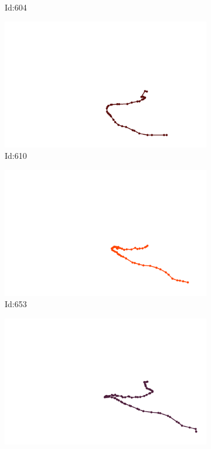 \documentclass[12pt,twoside]{report}
\begin{document}
\begin{figure}
\begin{subfigure}[b]{0.20\textwidth}
\caption{Id:604}
\end{subfigure}
\begin{subfigure}[b]{0.20\textwidth}
\centering
\includegraphics[width=\textwidth]{../trajectories/610.png}
\caption{Id:610}
\end{subfigure}
\begin{subfigure}[b]{0.20\textwidth}
\centering
\includegraphics[width=\textwidth]{../trajectories/653.png}
\caption{Id:653}
\end{subfigure}
\begin{subfigure}[b]{0.20\textwidth}
\centering
\includegraphics[width=\textwidth]{../trajectories/676.png}

\end{subfigure}
\end{figure}
\end{document}
